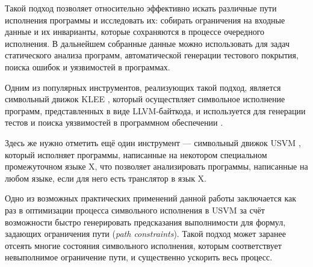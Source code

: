 Такой подход позволяет относительно эффективно искать различные пути исполнения программы и исследовать их: собирать ограничения на входные данные и их инварианты, которые сохраняются в процессе очередного исполнения. В дальнейшем собранные данные можно использовать для задач статического анализа программ, автоматической генерации тестового покрытия, поиска ошибок и уязвимостей в программах.

Одним из популярных инструментов, реализующих такой подход, является символьный движок KLEE \cite{klee-website}, который осуществляет символьное исполнение программ, представленных в виде LLVM-байткода, и используется для генерации тестов и поиска уязвимостей в программном обеспечении \cite{klee-paper}.

Здесь же нужно отметить ещё один инструмент --- символьный движок USVM \cite{usvm-diploma}, который исполняет программы, написанные на некотором специальном промежуточном языке X, что позволяет анализировать программы, написанные на любом языке, если для него есть транслятор в язык X.

Одно из возможных практических применений данной работы заключается как раз в оптимизации процесса символьного исполнения в USVM за счёт возможности быстро генерировать предсказания выполнимости для формул, задающих ограничения пути (\textit{path constraints}). Такой подход может заранее отсеять многие состояния символьного исполнения, которым соответствует невыполнимое ограничение пути, и существенно ускорить весь процесс.

